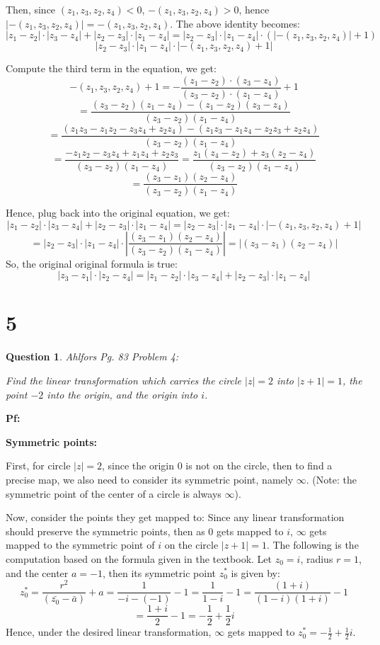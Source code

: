 \documentclass{article}
\newtheorem{question}{Question}
\begin{document}
\hfill

Then, since $(z_1,z_3,z_2,z_4)<0$, $-(z_1,z_3,z_2,z_4)>0$, hence $|-(z_1,z_3,z_2,z_4)|=-(z_1,z_3,z_2,z_4)$. The above identity becomes:
$$|z_1-z_2|\cdot|z_3-z_4|+|z_2-z_3|\cdot|z_1-z_4|=|z_2-z_3|\cdot|z_1-z_4|\cdot(|-(z_1,z_3,z_2,z_4)|+1)$$
$$|z_2-z_3|\cdot|z_1-z_4|\cdot|-(z_1,z_3,z_2,z_4)+1|$$

Compute the third term in the equation, we get:
$$-(z_1,z_3,z_2,z_4)+1=-\frac{(z_1-z_2)\cdot(z_3-z_4)}{(z_3-z_2)\cdot(z_1-z_4)}+1$$
$$=\frac{(z_3-z_2)(z_1-z_4)-(z_1-z_2)(z_3-z_4)}{(z_3-z_2)(z_1-z_4)}$$
$$=\frac{(z_1z_3-z_1z_2-z_3z_4+z_2z_4)-(z_1z_3-z_1z_4-z_2z_3+z_2z_4)}{(z_3-z_2)(z_1-z_4)}$$
$$=\frac{-z_1z_2-z_3z_4+z_1z_4+z_2z_3}{(z_3-z_2)(z_1-z_4)}=\frac{z_1(z_4-z_2)+z_3(z_2-z_4)}{(z_3-z_2)(z_1-z_4)}$$
$$=\frac{(z_3-z_1)(z_2-z_4)}{(z_3-z_2)(z_1-z_4)}$$

Hence, plug back into the original equation, we get:
$$|z_1-z_2|\cdot|z_3-z_4|+|z_2-z_3|\cdot|z_1-z_4|=|z_2-z_3|\cdot|z_1-z_4|\cdot|-(z_1,z_3,z_2,z_4)+1|$$
$$=|z_2-z_3|\cdot|z_1-z_4|\cdot\left|\frac{(z_3-z_1)(z_2-z_4)}{(z_3-z_2)(z_1-z_4)}\right|=\left|(z_3-z_1)(z_2-z_4)\right|$$
So, the original original formula is true:
$$|z_3-z_1|\cdot|z_2-z_4|=|z_1-z_2|\cdot|z_3-z_4|+|z_2-z_3|\cdot|z_1-z_4|$$


\break

\section*{5}
\begin{myBox}[]{}
    \begin{question}
        Ahlfors Pg. 83 Problem 4:

        Find the linear transformation which carries the circle $|z|=2$ into $|z+1|=1$,
        the point $-2$ into the origin, and the origin into $i$.
    \end{question}
\end{myBox}

\textbf{Pf:}

\textbf{Symmetric points:}

First, for circle $|z|=2$, since the origin $0$ is not on the circle, then to find a precise map, we also need to consider
its symmetric point, namely $\infty$. (Note: the symmetric point of the center of a circle is always $\infty$).

\hfill

Now, consider the points they get mapped to: Since any linear transformation should preserve the symmetric points,
then as $0$ gets mapped to $i$, $\infty$ gets mapped to the symmetric point of $i$ on the circle $|z+1|=1$.
The following is the computation based on the formula given in the textbook. Let $z_0=i$, radius $r=1$, and the center $a=-1$, then its symmetric point $z_0^*$ is given by:
$$z_0^*=\frac{r^2}{(\bar{z_0}-\bar{a})}+a = \frac{1}{-i-(-1)}-1 = \frac{1}{1-i}-1 = \frac{(1+i)}{(1-i)(1+i)}-1$$
$$=\frac{1+i}{2}-1 = -\frac{1}{2}+\frac{1}{2}i$$
Hence, under the desired linear transformation, $\infty$ gets mapped to $z_0^*=-\frac{1}{2}+\frac{1}{2}i$.
\end{document}
